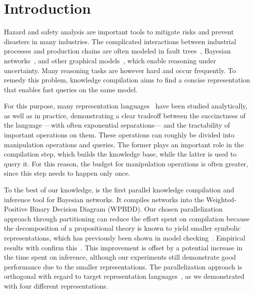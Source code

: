 
\section{Introduction}
\label{sec:introduction}

Hazard and safety analysis are important tools to mitigate risks and prevent disasters in many industries. The complicated interactions between industrial processes and production chains are often modeled in fault trees~\cite{sokukcu2022risk}, Bayesian networks~\cite{pearl2011bayesian}, and other graphical models~\cite{darwiche2022complete}, which enable reasoning under uncertainty.
Many reasoning tasks are however hard and occur frequently. To remedy this problem, knowledge compilation aims to find a concise representation that enables fast queries on the same model.

For this purpose, many representation languages~\cite{chavira2008probabilistic,darwiche2011sdd,hitzler2022tractable,sanner2005affine,tafertshofer1997factored} have been studied analytically, as well as in practice, demonstrating a clear tradeoff between the succinctness of the language ---with often exponential separations--- and the tractability of important operations on them. These operations can roughly be divided into manipulation operations and queries. The former plays an important role in the compilation step, which builds the knowledge base, while the latter is used to query it. For this reason, the budget for manipulation operations is often greater, since this step needs to happen only once.

To the best of our knowledge, \toolname is the first parallel knowledge compilation and inference tool for Bayesian networks. It compiles networks into the Weighted-Positive Binary Decision Diagram (WPBDD). Our chosen parallelization approach through partitioning can reduce the effort spent on compilation because the decomposition of a propositional theory is known to yield smaller symbolic representations, which has previously been shown in model checking~\cite{narayan1996partitioned,sahoo2004partitioning,darwiche2021quantifying,darwiche2022complete}. Empirical results with \toolname confirm this~\cite{dal2017reducing}.
 This improvement is offset by a potential increase in the time spent on inference, although our experiments still demonstrate good performance due to the smaller representations. The parallelization approach is orthogonal with regard to target representation languages~\cite{dal2018parallel}, as we demonstrated with four different representations.


